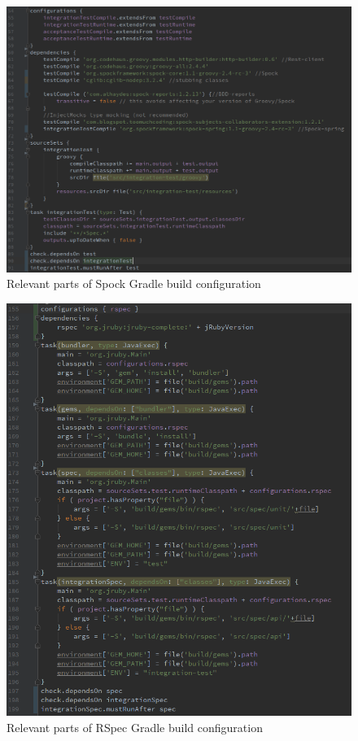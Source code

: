 \begin{figure}[ht]
  \begin{center}
    \includegraphics[width=13.7cm]{images/spock-gradle.png}
    \caption{Relevant parts of Spock Gradle build configuration}
    \label{fig:spock-build}
  \end{center}
\end{figure}

\begin{figure}[ht]
  \begin{center}
    \includegraphics[width=13.7cm]{images/rspec-build.png}
    \caption{Relevant parts of RSpec Gradle build configuration}
    \label{fig:rspec-build}
  \end{center}
\end{figure}

